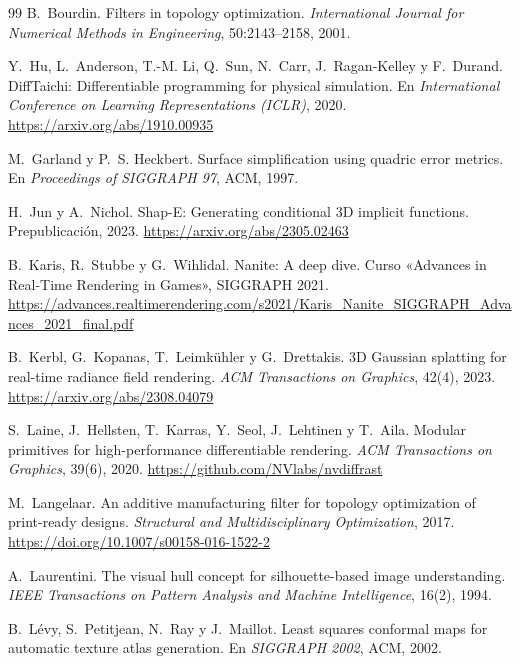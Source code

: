\begin{thebibliography}{99}
B.~Bourdin.
\newblock Filters in topology optimization.
\newblock \emph{International Journal for Numerical Methods in Engineering}, 50:2143--2158, 2001.

Y.~Hu, L.~Anderson, T.-M. Li, Q.~Sun, N.~Carr, J.~Ragan-Kelley y F.~Durand.
\newblock DiffTaichi: Differentiable programming for physical simulation.
\newblock En \emph{International Conference on Learning Representations (ICLR)}, 2020.
\newblock \url{https://arxiv.org/abs/1910.00935}

M.~Garland y P.~S. Heckbert.
\newblock Surface simplification using quadric error metrics.
\newblock En \emph{Proceedings of SIGGRAPH 97}, ACM, 1997.

H.~Jun y A.~Nichol.
\newblock Shap-E: Generating conditional 3D implicit functions.
\newblock Prepublicación, 2023.
\newblock \url{https://arxiv.org/abs/2305.02463}

B.~Karis, R.~Stubbe y G.~Wihlidal.
\newblock Nanite: A deep dive.
\newblock Curso «Advances in Real-Time Rendering in Games», SIGGRAPH 2021.
\newblock \url{https://advances.realtimerendering.com/s2021/Karis_Nanite_SIGGRAPH_Advances_2021_final.pdf}

B.~Kerbl, G.~Kopanas, T.~Leimkühler y G.~Drettakis.
\newblock 3D Gaussian splatting for real-time radiance field rendering.
\newblock \emph{ACM Transactions on Graphics}, 42(4), 2023.
\newblock \url{https://arxiv.org/abs/2308.04079}

S.~Laine, J.~Hellsten, T.~Karras, Y.~Seol, J.~Lehtinen y T.~Aila.
\newblock Modular primitives for high-performance differentiable rendering.
\newblock \emph{ACM Transactions on Graphics}, 39(6), 2020.
\newblock \url{https://github.com/NVlabs/nvdiffrast}

M.~Langelaar.
\newblock An additive manufacturing filter for topology optimization of print-ready designs.
\newblock \emph{Structural and Multidisciplinary Optimization}, 2017.
\newblock \url{https://doi.org/10.1007/s00158-016-1522-2}

A.~Laurentini.
\newblock The visual hull concept for silhouette-based image understanding.
\newblock \emph{IEEE Transactions on Pattern Analysis and Machine Intelligence}, 16(2), 1994.

B.~Lévy, S.~Petitjean, N.~Ray y J.~Maillot.
\newblock Least squares conformal maps for automatic texture atlas generation.
\newblock En \emph{SIGGRAPH 2002}, ACM, 2002.


\end{thebibliography}
